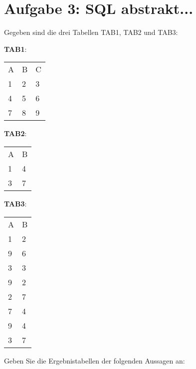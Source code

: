 \documentclass{lehramt-informatik-haupt}
\newcommand{\tmptabelle}[1]{
\bigskip
\par
\noindent
\textbf{#1}:
\bigskip
\par
\noindent
}
\begin{document}
%

\section{Aufgabe 3: SQL abstrakt...}

Gegeben sind die drei Tabellen TAB1, TAB2 und TAB3:

\tmptabelle{TAB1}

\begin{tabular}{lll}
A&B&C\\
1&2&3\\
4&5&6\\
7&8&9\\
\end{tabular}

\tmptabelle{TAB2}

\begin{tabular}{ll}
A&B\\
1&4\\
3&7\\
\end{tabular}

\tmptabelle{TAB3}

\begin{tabular}{ll}
A&B\\
1&2\\
9&6\\
3&3\\
9&2\\
2&7\\
7&4\\
9&4\\
3&7\\
\end{tabular}

\bigskip

Geben Sie die Ergebnistabellen der folgenden Aussagen an:
\end{document}
